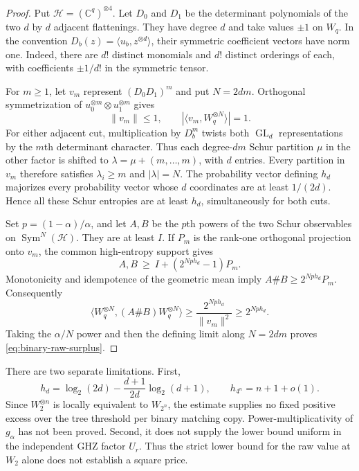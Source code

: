 \begin{proof}
Put \(\mathcal H=(\mathbb C^q)^{\otimes4}\).
Let $D_0$ and $D_1$ be the determinant polynomials of the two
$d$ by $d$ adjacent flattenings. They have degree $d$ and take
values $\pm1$ on $W_q$. In the convention
$D_b(z)=\langle u_b,z^{\otimes d}\rangle$, their symmetric
coefficient vectors have norm one. Indeed, there are $d!$
distinct monomials and $d!$ distinct orderings of each, with
coefficients $\pm1/d!$ in the symmetric tensor.

For $m\geq1$, let $v_m$ represent $(D_0D_1)^m$ and put $N=2dm$.
Orthogonal symmetrization of $u_0^{\otimes m}\otimes u_1^{\otimes m}$
gives
\[
 \|v_m\|\leq1,\qquad
 |\langle v_m,W_q^{\otimes N}\rangle|=1.
\]
For either adjacent cut, multiplication by $D_b^m$ twists both
$\operatorname{GL}_d$ representations by the $m$th determinant
character. Thus each degree-$dm$ Schur partition $\mu$ in the
other factor is shifted to
$\lambda=\mu+(m,\ldots,m)$, with $d$ entries.
Every partition in $v_m$ therefore satisfies $\lambda_i\geq m$
and $|\lambda|=N$. The probability vector defining $h_d$
majorizes every probability vector whose $d$ coordinates are
at least $1/(2d)$. Hence all these Schur entropies are at least
$h_d$, simultaneously for both cuts.

Set $p=(1-\alpha)/\alpha$, and let $A,B$ be the $p$th powers
of the two Schur observables on $\operatorname{Sym}^N(\mathcal H)$.
They are at least $I$. If $P_m$ is the rank-one orthogonal
projection onto $v_m$, the common high-entropy support gives
\[
 A,B\ \geq\ I+(2^{Nph_d}-1)P_m.
\]
Monotonicity and idempotence of the geometric mean imply
$A\#B\geq2^{Nph_d}P_m$. Consequently
\[
 \langle W_q^{\otimes N},(A\#B)W_q^{\otimes N}\rangle
 \geq\frac{2^{Nph_d}}{\|v_m\|^2}
 \geq2^{Nph_d}.
\]
Taking the $\alpha/N$ power and then the defining limit along
$N=2dm$ proves \eqref{eq:binary-raw-surplus}.
\end{proof}

There are two separate limitations. First,
\[
 h_d=\log_2(2d)-\frac{d+1}{2d}\log_2(d+1),
 \qquad h_{4^n}=n+1+o(1).
\]
Since $W_2^{\otimes n}$ is locally equivalent to $W_{2^n}$,
the estimate supplies no fixed positive excess over the tree
threshold per binary matching copy. Power-multiplicativity of
$g_\alpha$ has not been proved. Second, it does not supply the
lower bound uniform in the independent GHZ factor $U_r$.
Thus the strict lower bound for the raw value at $W_2$ alone
does not establish a square price.

